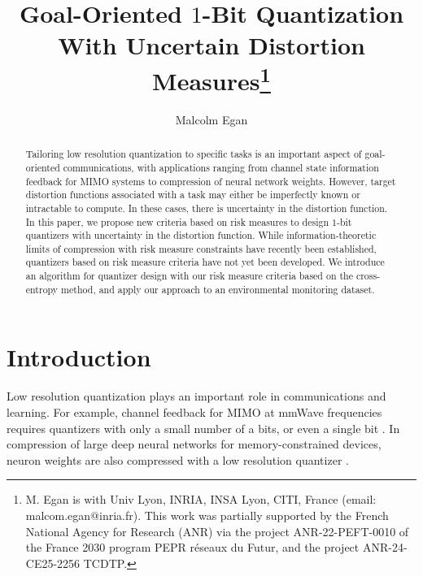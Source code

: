 \documentclass[journal]{IEEEtran}
\begin{document}
	
	\title{Goal-Oriented $1$-Bit Quantization With Uncertain Distortion Measures\thanks{M. Egan is with Univ Lyon, INRIA, INSA Lyon, CITI, France (email: malcom.egan@inria.fr). This work was partially supported by the French National Agency for Research (ANR) via the project ANR-22-PEFT-0010 of the France 2030 program PEPR réseaux du Futur, and the project ANR-24-CE25-2256 TCDTP.}}
	

\author{Malcolm Egan}

\maketitle

\begin{abstract}
Tailoring low resolution quantization to specific tasks is an important aspect of goal-oriented communications, with applications ranging from channel state information feedback for MIMO systems to compression of neural network weights. However, target distortion functions associated with a task may either be imperfectly known or intractable to compute. In these cases, there is uncertainty in the distortion function. In this paper, we propose new criteria based on risk measures to design $1$-bit quantizers with uncertainty in the distortion function. While information-theoretic limits of compression with risk measure constraints have recently been established, quantizers based on risk measure criteria have not yet been developed. We introduce an algorithm for quantizer design with our risk measure criteria based on the cross-entropy method, and apply our approach to an environmental monitoring dataset. 
\end{abstract}


\maketitle

\section{Introduction}

Low resolution quantization plays an important role in communications and learning. For example, channel feedback for MIMO at mmWave frequencies requires quantizers with only a small number of a bits, or even a single bit \cite{Mo2015capacity}. In compression of large deep neural networks for memory-constrained devices, neuron weights are also compressed with a low resolution quantizer \cite{Nahshan2021loss}. 
\end{document}
